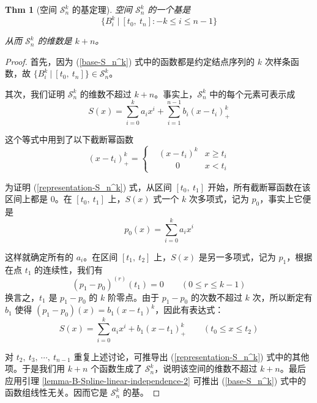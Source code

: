 \documentclass[a4paper]{article}
\newtheorem{theorem}{Thm}
\begin{document}
    \begin{theorem}[空间 $\mathcal{S}_n^k$ 的基定理]
        空间 $\mathcal{S}_n^k$ 的一个基是
        \begin{equation}
        \label{base-S_n^k}
            \{ B_i^k\ |\ [t_0,\ t_n]: -k \leqslant i \leqslant n-1 \}
        \end{equation}

        \noindent 从而 $\mathcal{S}_n^k$ 的维数是 $k+n$。
    \end{theorem}
    \begin{proof}[Proof]
        首先，因为 (\ref{base-S_n^k}) 式中的函数都是约定结点序列的 $k$ 次样条函数，故 $\{ B_i^k\ |\ [t_0,\ t_n] \} \in \mathcal{S}_n^k$。

        其次，我们证明 $\mathcal{S}_n^k$ 的维数不超过 $k+n$。事实上，$\mathcal{S}_n^k$ 中的每个元素可表示成
        \begin{equation}
        \label{representation-S_n^k}
            S(x) = \sum_{i = 0}^{k} a_i x^i + \sum_{i = 1}^{n-1} b_i (x - t_i)_+^k
        \end{equation}

        \noindent 这个等式中用到了以下截断幂函数
        \begin{equation*}
            (x - t_i)_+^k = \left\{\begin{aligned}
                & (x - t_i)^k & x \geqslant t_i \\
                & \qquad 0 \qquad & x < t_i
            \end{aligned}\right.
        \end{equation*}

        \noindent 为证明 (\ref{representation-S_n^k}) 式，从区间 $[t_0,\ t_1]$ 开始，所有截断幂函数在该区间上都是 $0$。在 $[t_0,\ t_1]$ 上，$S(x)$ 式一个 $k$ 次多项式，记为 $p_0$，事实上它便是
        \begin{equation}
            p_0(x) = \sum_{i = 0}^{k} a_i x^i
        \end{equation}

        \noindent 这样就确定所有的 $a_i$。在区间 $[t_1,\ t_2]$ 上，$S(x)$ 是另一多项式，记为 $p_1$，根据在点 $t_1$ 的连续性，我们有
        \begin{equation*}
            (p_1 - p_0)^{(r)} (t_1) = 0 \qquad (0 \leqslant r \leqslant k-1)
        \end{equation*}
        换言之，$t_1$ 是 $p_1 - p_0$ 的 $k$ 阶零点。由于 $p_1 - p_0$ 的次数不超过 $k$ 次，所以断定有 $b_1$ 使得 $(p_1 - p_0)(x) = b_1 (x - t_1)^k$，因此有表达式：
        \begin{equation*}
            S(x) = \sum_{i = 0}^{k} a_i x^i + b_1 (x - t_1)_+^k \qquad (t_0 \leqslant x \leqslant t_2)
        \end{equation*}

        \noindent 对 $t_2,\ t_3,\ \cdots,\ t_{n-1}$ 重复上述讨论，可推导出 (\ref{representation-S_n^k}) 式中的其他项。于是我们用 $k+n$ 个函数生成了 $\mathcal{S}_n^k$，说明该空间的维数不超过 $k+n$。最后应用引理 \ref{lemma-B-Spline-linear-independence-2} 可推出 (\ref{base-S_n^k}) 式中的函数组线性无关。因而它是 $\mathcal{S}_n^k$ 的基。
    \end{proof}
\end{document}
